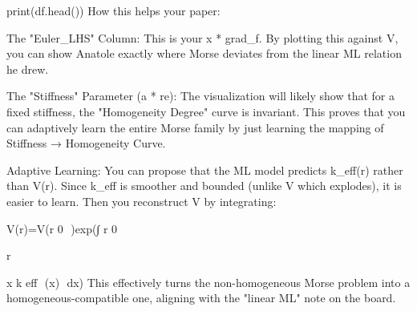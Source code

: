 print(df.head())
How this helps your paper:

The "Euler_LHS" Column: This is your x * grad_f. By plotting this against V, you can show Anatole exactly where Morse deviates from the linear ML relation he drew.

The "Stiffness" Parameter (a * re): The visualization will likely show that for a fixed stiffness, the "Homogeneity Degree" curve is invariant. This proves that you can adaptively learn the entire Morse family by just learning the mapping of Stiffness → Homogeneity Curve.

Adaptive Learning: You can propose that the ML model predicts k_eff(r) rather than V(r). Since k_eff is smoother and bounded (unlike V which explodes), it is easier to learn. Then you reconstruct V by integrating:

V(r)=V(r 
0
​	
 )exp(∫ 
r 
0
​	
 
r
​	
  
x
k 
eff
​	
 (x)
​	
 dx)
This effectively turns the non-homogeneous Morse problem into a homogeneous-compatible one, aligning with the "linear ML" note on the board.
